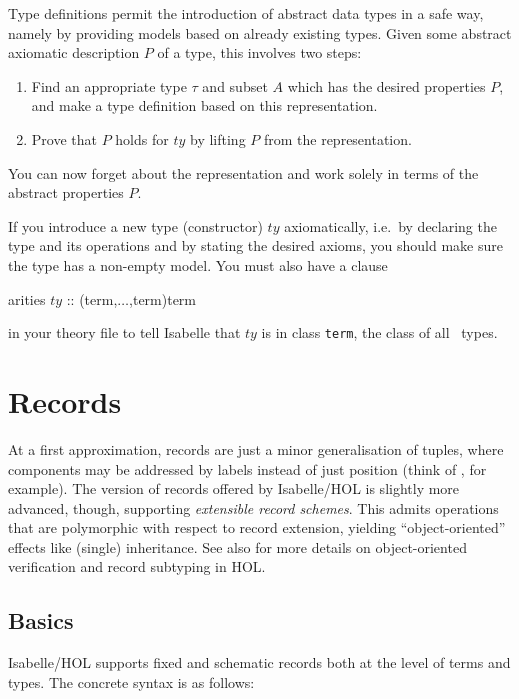 Type definitions permit the introduction of abstract data types in a safe
way, namely by providing models based on already existing types.  Given some
abstract axiomatic description $P$ of a type, this involves two steps:
\begin{enumerate}
\item Find an appropriate type $\tau$ and subset $A$ which has the desired
  properties $P$, and make a type definition based on this representation.
\item Prove that $P$ holds for $ty$ by lifting $P$ from the representation.
\end{enumerate}
You can now forget about the representation and work solely in terms of the
abstract properties $P$.

\begin{warn}
If you introduce a new type (constructor) $ty$ axiomatically, i.e.\ by
declaring the type and its operations and by stating the desired axioms, you
should make sure the type has a non-empty model.  You must also have a clause
\par
\begin{ttbox}
arities \(ty\) :: (term,\thinspace\(\dots\),{\thinspace}term){\thinspace}term
\end{ttbox}
in your theory file to tell Isabelle that $ty$ is in class \texttt{term}, the
class of all \HOL\ types.
\end{warn}


\section{Records}

At a first approximation, records are just a minor generalisation of tuples,
where components may be addressed by labels instead of just position (think of
{\ML}, for example).  The version of records offered by Isabelle/HOL is
slightly more advanced, though, supporting \emph{extensible record schemes}.
This admits operations that are polymorphic with respect to record extension,
yielding ``object-oriented'' effects like (single) inheritance.  See also
\cite{Naraschewski-Wenzel:1998:TPHOL} for more details on object-oriented
verification and record subtyping in HOL.


\subsection{Basics}

Isabelle/HOL supports fixed and schematic records both at the level of terms
and types.  The concrete syntax is as follows:

